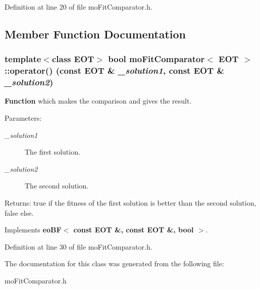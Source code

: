 Definition at line 20 of file moFitComparator.h.

\subsection{Member Function Documentation}
\subsubsection{\setlength{\rightskip}{0pt plus 5cm}template$<$class EOT$>$ bool {\bf moFitComparator}$<$ EOT $>$::operator() (const EOT \& {\em \_\-solution1}, const EOT \& {\em \_\-solution2})\hspace{0.3cm}{\tt  [inline, virtual]}}\label{classmo_fit_comparator_c920d5a49deb16710daf1e5fcde6b16c}


{\bf Function} which makes the comparison and gives the result. 

\begin{Desc}
\item[Parameters:]
\begin{description}
\item[{\em \_\-solution1}]The first solution. \item[{\em \_\-solution2}]The second solution. \end{description}
\end{Desc}
\begin{Desc}
\item[Returns:]true if the fitness of the first solution is better than the second solution, false else. \end{Desc}


Implements {\bf eoBF$<$ const EOT \&, const EOT \&, bool $>$}.

Definition at line 30 of file moFitComparator.h.

The documentation for this class was generated from the following file:\begin{CompactItemize}
\item 
moFitComparator.h\end{CompactItemize}
